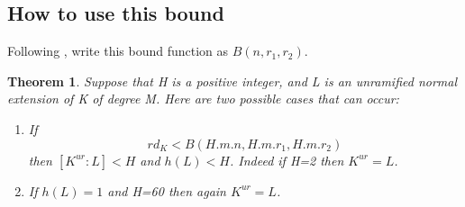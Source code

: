 \documentclass[preprint,12pt,reqno]{elsarticle}
\newtheorem{theorem}{Theorem}
\begin{document}
\subsection{How to use this bound}
Following \cite{YAM2}, write this bound function as $B(n,r_1,r_2)$.
\begin{theorem}
Suppose that H is a positive integer, and L is an unramified normal extension of K of degree M. Here are two possible cases that can occur:
\begin{enumerate}
    \item If \begin{equation}
        rd_K<B(H.m.n,H.m.r_1,H.m.r_2)
    \end{equation}
    then $[K^{ur}:L]<H$ and $h(L)<H$. Indeed if H=2 then $K^{ur}=L$.

    \item If
        $h(L)=1$ and H=60 then again $K^{ur}=L$.
\end{enumerate}
\end{theorem}
\end{document}
